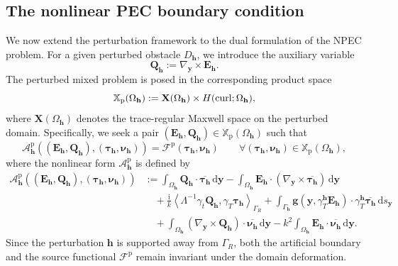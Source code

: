 \documentclass[12pt,reqno]{amsart}
\theoremstyle{definition}
\numberwithin{equation}{section}
\begin{document}
\subsection{The nonlinear PEC boundary condition}

We now extend the perturbation framework to the dual formulation of the
NPEC problem. For a given perturbed obstacle \(D_{\mathbf h}\), we introduce
the auxiliary variable
\[
\mathbf Q_{\mathbf h}:=\nabla_{\boldsymbol y}\times\mathbf E_{\mathbf h}.
\]
The perturbed mixed problem is posed in the corresponding product space
\[
\mathbb X_{\rm p}(\Omega_{\mathbf h})
:=
\mathbf X(\Omega_{\mathbf h})
\times
H(\operatorname{curl};\Omega_{\mathbf h}),
\]
where \(\mathbf X(\Omega_{\mathbf h})\) denotes the trace-regular Maxwell
space on the perturbed domain.
Specifically, we seek a pair $(\mathbf{E}_{\mathbf{h}}, \mathbf{Q}_{\mathbf{h}}) \in \mathbb{X}_{\mathrm{p}}(\Omega_{\mathbf{h}})$ such that 
\begin{equation}
\label{eq:perturbed_NPEC_mixed}
\mathcal{A}_{\mathbf{h}}^{\mathrm{p}} \left( (\mathbf{E}_{\mathbf{h}}, \mathbf{Q}_{\mathbf{h}}), (\boldsymbol{\tau}_{\mathbf{h}}, \boldsymbol{\nu}_{\mathbf{h}}) \right) = \mathcal{F}^{\mathrm{p}}(\boldsymbol{\tau}_{\mathbf{h}}, \boldsymbol{\nu}_{\mathbf{h}}) \qquad \forall (\boldsymbol{\tau}_{\mathbf{h}}, \boldsymbol{\nu}_{\mathbf{h}}) \in \mathbb{X}_{\mathrm{p}}(\Omega_{\mathbf{h}}),
\end{equation}
where the nonlinear form $\mathcal{A}_{\mathbf{h}}^{\mathrm{p}}$ is defined by
\begin{equation}
\label{eq:NPEC_form_definition}
\begin{aligned}
\mathcal{A}_{\mathbf{h}}^{\mathrm{p}} \left( (\mathbf{E}_{\mathbf{h}}, \mathbf{Q}_{\mathbf{h}}), (\boldsymbol{\tau}_{\mathbf{h}}, \boldsymbol{\nu}_{\mathbf{h}}) \right) &:= \int_{\Omega_{\mathbf{h}}} \mathbf{Q}_{\mathbf{h}} \cdot \overline{\boldsymbol{\tau}_{\mathbf{h}}} \,\mathrm{d}\boldsymbol{y} - \int_{\Omega_{\mathbf{h}}} \mathbf{E}_{\mathbf{h}} \cdot (\nabla_{\boldsymbol{y}} \times \overline{\boldsymbol{\tau}_{\mathbf{h}}}) \,\mathrm{d}\boldsymbol{y} \\
&\quad + \frac{\mathrm{i}}{k} \left\langle \Lambda^{-1} \gamma_t \mathbf{Q}_{\mathbf{h}}, \gamma_T \boldsymbol{\tau}_{\mathbf{h}} \right\rangle_{\Gamma_R} + \int_{\Gamma_{\mathbf{h}}} \mathbf{g}(\boldsymbol{y}, \gamma_T^{\mathbf{h}} \mathbf{E}_{\mathbf{h}}) \cdot \gamma_T^{\mathbf{h}} \overline{\boldsymbol{\tau}_{\mathbf{h}}} \,\mathrm{d}s_{\boldsymbol{y}} \\
&\quad + \int_{\Omega_{\mathbf{h}}} (\nabla_{\boldsymbol{y}} \times \mathbf{Q}_{\mathbf{h}}) \cdot \overline{\boldsymbol{\nu}_{\mathbf{h}}} \,\mathrm{d}\boldsymbol{y} - k^2 \int_{\Omega_{\mathbf{h}}} \mathbf{E}_{\mathbf{h}} \cdot \overline{\boldsymbol{\nu}_{\mathbf{h}}} \,\mathrm{d}\boldsymbol{y}.
\end{aligned}
\end{equation}
Since the perturbation $\mathbf{h}$ is supported away from $\Gamma_R$, both the artificial boundary and the source functional $\mathcal{F}^{\mathrm{p}}$ remain invariant under the domain deformation.
\end{document}

